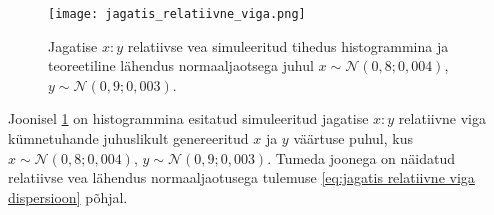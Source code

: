 \begin{figure}[H]
    \begin{center}
        \texttt{[image: jagatis\_relatiivne\_viga.png]}
    \end{center}
    \caption{Jagatise $x:y$ relatiivse vea simuleeritud tihedus histogrammina ja teoreetiline lähendus normaaljaotsega juhul $x\sim\mathcal{N}(0{,}8; 0{,}004)$, $y\sim\mathcal{N}(0{,}9; 0{,}003)$.}
    \label{fig:jagatis relatiivne viga tihedus}
\end{figure}

Joonisel \ref{fig:jagatis relatiivne viga tihedus} on histogrammina esitatud simuleeritud jagatise $x:y$ relatiivne viga kümnetuhande juhuslikult genereeritud $x$ ja $y$ väärtuse puhul, kus $x\sim\mathcal{N}(0{,}8; 0{,}004)$, $y\sim\mathcal{N}(0{,}9; 0{,}003)$. Tumeda joonega on näidatud relatiivse vea lähendus normaaljaotusega tulemuse \eqref{eq:jagatis relatiivne viga dispersioon} põhjal.